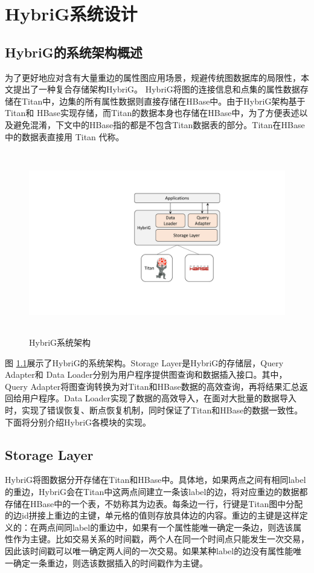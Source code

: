 
\chapter{HybriG系统设计} \label{chap:design}
\section{HybriG的系统架构概述}
为了更好地应对含有大量重边的属性图应用场景，规避传统图数据库的局限性，本文提出了一种复合存储架构HybriG。
HybriG将图的连接信息和点集的属性数据存储在Titan中，边集的所有属性数据则直接存储在HBase中。由于HybriG架构基于Titan和 HBase实现存储，而Titan的数据本身也存储在HBase中，为了方便表述以及避免混淆，下文中的HBase指的都是不包含Titan数据表的部分。Titan在HBase中的数据表直接用 Titan 代称。

\begin{figure}[htbp]
\centering
\includegraphics[height=80mm]{fig/arch.pdf}
\caption{HybriG系统架构}
\label{fig:arch}
\end{figure}

图 \ref{fig:arch}展示了HybriG的系统架构。Storage Layer是HybriG的存储层，Query Adapter和 Data Loader分别为用户程序提供图查询和数据插入接口。其中，Query Adapter将图查询转换为对Titan和HBase数据的高效查询，再将结果汇总返回给用户程序。Data Loader实现了数据的高效导入，在面对大批量的数据导入时，实现了错误恢复、断点恢复机制，同时保证了Titan和HBase的数据一致性。下面将分别介绍HybriG各模块的实现。


\section{Storage Layer}
HybriG将图数据分开存储在Titan和HBase中。具体地，如果两点之间有相同label的重边，HybriG会在Titan中这两点间建立一条该label的边，将对应重边的数据都存储在HBase中的一个表，不妨称其为边表。每条边一行，行键是Titan图中分配的边id拼接上重边的主键，单元格的值则存放具体边的内容。重边的主键是这样定义的：在两点间同label的重边中，如果有一个属性能唯一确定一条边，则选该属性作为主键。比如交易关系的时间戳，两个人在同一个时间点只能发生一次交易，因此该时间戳可以唯一确定两人间的一次交易。如果某种label的边没有属性能唯一确定一条重边，则选该数据插入的时间戳作为主键。

